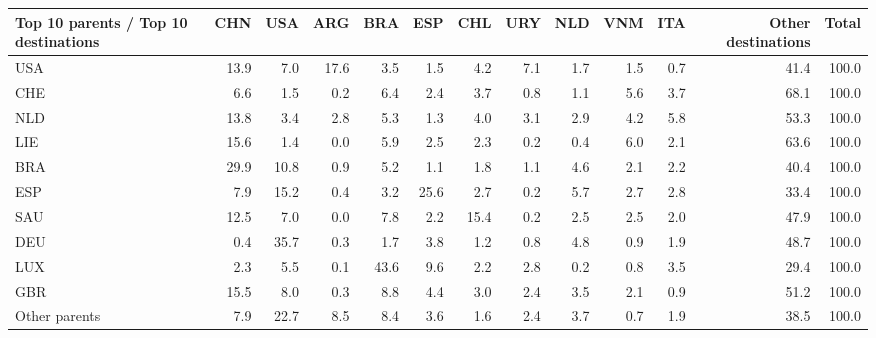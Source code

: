 \begin{tabular}{lrrrrrrrrrrrr}
\toprule
Top 10 parents / Top 10 destinations & CHN & USA & ARG & BRA & ESP & CHL & URY & NLD & VNM & ITA & Other destinations & Total \\
\midrule
USA & 13.9 & 7.0 & 17.6 & 3.5 & 1.5 & 4.2 & 7.1 & 1.7 & 1.5 & 0.7 & 41.4 & 100.0 \\
CHE & 6.6 & 1.5 & 0.2 & 6.4 & 2.4 & 3.7 & 0.8 & 1.1 & 5.6 & 3.7 & 68.1 & 100.0 \\
NLD & 13.8 & 3.4 & 2.8 & 5.3 & 1.3 & 4.0 & 3.1 & 2.9 & 4.2 & 5.8 & 53.3 & 100.0 \\
LIE & 15.6 & 1.4 & 0.0 & 5.9 & 2.5 & 2.3 & 0.2 & 0.4 & 6.0 & 2.1 & 63.6 & 100.0 \\
BRA & 29.9 & 10.8 & 0.9 & 5.2 & 1.1 & 1.8 & 1.1 & 4.6 & 2.1 & 2.2 & 40.4 & 100.0 \\
ESP & 7.9 & 15.2 & 0.4 & 3.2 & 25.6 & 2.7 & 0.2 & 5.7 & 2.7 & 2.8 & 33.4 & 100.0 \\
SAU & 12.5 & 7.0 & 0.0 & 7.8 & 2.2 & 15.4 & 0.2 & 2.5 & 2.5 & 2.0 & 47.9 & 100.0 \\
DEU & 0.4 & 35.7 & 0.3 & 1.7 & 3.8 & 1.2 & 0.8 & 4.8 & 0.9 & 1.9 & 48.7 & 100.0 \\
LUX & 2.3 & 5.5 & 0.1 & 43.6 & 9.6 & 2.2 & 2.8 & 0.2 & 0.8 & 3.5 & 29.4 & 100.0 \\
GBR & 15.5 & 8.0 & 0.3 & 8.8 & 4.4 & 3.0 & 2.4 & 3.5 & 2.1 & 0.9 & 51.2 & 100.0 \\
Other parents & 7.9 & 22.7 & 8.5 & 8.4 & 3.6 & 1.6 & 2.4 & 3.7 & 0.7 & 1.9 & 38.5 & 100.0 \\
\bottomrule
\end{tabular}
